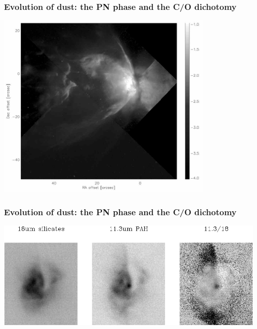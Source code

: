 \begin{frame}
\begin{minipage}[t]{0.45\textwidth}
\begin{center}
\end{center}
\end{minipage}

\end{frame}
\begin{frame}\frametitle{Evolution of dust:
the PN phase and the C/O dichotomy}


\begin{center}
\includegraphics[width=0.8\textwidth,height=!]{./D/matsuura_hstngc6302.jpg}
\end{center}


\end{frame}
\begin{frame}\frametitle{Evolution of dust:
the PN phase and the C/O dichotomy}


\begin{center}
\includegraphics[width=\textwidth,height=!]{./D/trecs_prelim.pdf}
\end{center}


\end{frame}
